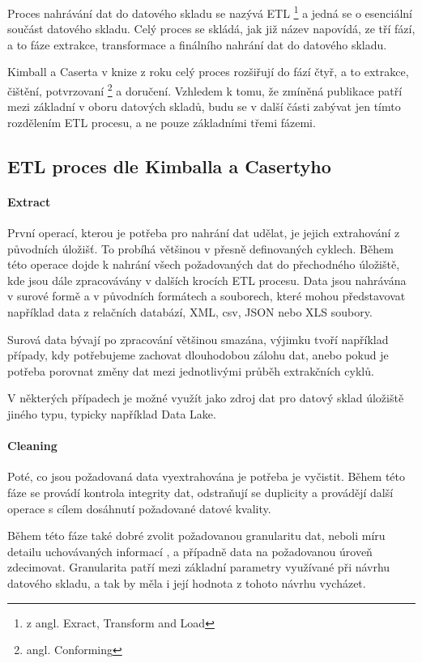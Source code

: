 \documentclass[
  digital,     %
  twoside,     %
  lof,         %
  lot,         %
]{fithesis4}
\begin{document}
Proces nahrávání dat do datového skladu se nazývá ETL \footnote{z angl. Exract, Transform and Load} a jedná se o esenciální součást datového skladu. Celý proces se skládá, jak již název napovídá, ze tří fází, a to fáze extrakce, transformace a finálního nahrání dat do datového skladu.

Kimball a Caserta v knize  z roku \citeyear{Kimballc2004} celý proces rozšiřují do fází čtyř, a to extrakce, čištění, potvrzovaní \footnote{angl. Conforming} a doručení. Vzhledem k tomu, že zmíněná publikace patří mezi základní v oboru datových skladů, budu se v další části zabývat jen tímto rozdělením ETL
procesu, a ne pouze základními třemi fázemi.

\subsection{ETL proces dle Kimballa a Casertyho}
\paragraph{Extract}
První operací, kterou je potřeba pro nahrání dat udělat, je jejich extrahování z původních úložišť. To probíhá většinou v přesně definovaných cyklech. Během této operace dojde k nahrání všech požadovaných dat do přechodného úložiště, kde jsou dále zpracovávány v dalších krocích ETL procesu. Data jsou nahrávána v surové formě a v původních formátech a souborech, které mohou představovat například data z relačních databází, XML, csv, JSON nebo XLS soubory.\parencite[s.~18]{Kimballc2004}

Surová data bývají po zpracování většinou smazána, výjimku tvoří například případy, kdy potřebujeme zachovat dlouhodobou zálohu dat, anebo pokud je potřeba porovnat změny dat mezi jednotlivými průběh extrakčních cyklů.\parencite[s.~18]{Kimballc2004}

V některých případech je možné využít jako zdroj dat pro datový sklad úložiště jiného typu, typicky například Data Lake.

\paragraph{Cleaning}
Poté, co jsou požadovaná data vyextrahována je potřeba je vyčistit. Během této fáze se provádí kontrola integrity dat, odstraňují se duplicity a provádějí další operace s cílem dosáhnutí požadované datové kvality.\parencite[s.~18-19]{Kimballc2004}

Během této fáze také dobré zvolit požadovanou granularitu dat, neboli míru detailu uchovávaných informací \parencite[s.~41]{Inmon2005}, a případně data na požadovanou úroveň zdecimovat. Granularita patří mezi základní parametry využívané při návrhu datového skladu, a tak by měla i její hodnota z tohoto návrhu vycházet.\parencite[s.~41]{Inmon2005}
\end{document}
